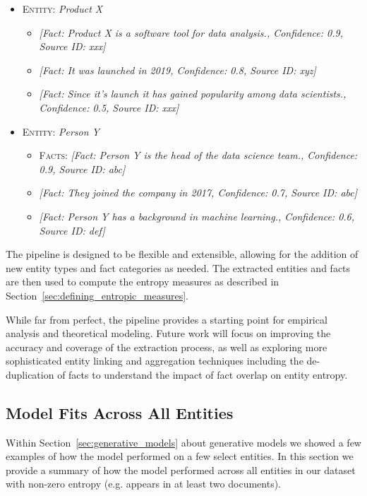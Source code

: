 \documentclass[11pt,a4paper]{article}
\begin{document}
\begin{itemize}
    \item \textsc{Entity:} \textit{Product X}
        \begin{itemize}
        \item \textit{[Fact: Product X is a software tool for data analysis., Confidence: 0.9, Source ID: xxx]}
        \item \textit{[Fact: It was launched in 2019, Confidence: 0.8, Source ID: xyz]}
        \item \textit{[Fact: Since it's launch it has gained popularity among data scientists., Confidence: 0.5, Source ID: xxx]}
        \end{itemize}
    \item \textsc{Entity:} \textit{Person Y}
        \begin{itemize}
        \item \textsc{Facts:} \textit{[Fact: Person Y is the head of the data science team., Confidence: 0.9, Source ID: abc]}
        \item \textit{[Fact: They joined the company in 2017, Confidence: 0.7, Source ID: abc]}
        \item \textit{[Fact: Person Y has a background in machine learning., Confidence: 0.6, Source ID: def]}
        \end{itemize}
    \end{itemize}

The pipeline is designed to be flexible and extensible, allowing for the addition of new entity types and fact categories as needed. The extracted entities and facts are then used to compute the entropy measures as described in Section~\ref{sec:defining_entropic_measures}.

While far from perfect, the pipeline provides a starting point for empirical analysis and theoretical modeling. Future work will focus on improving the accuracy and coverage of the extraction process, as well as exploring more sophisticated entity linking and aggregation techniques including the de-duplication of facts to understand the impact of fact overlap on entity entropy.

\subsection{Model Fits Across All Entities}
\label{appendix:model_fits}

Within Section~\ref{sec:generative_models} about generative models we showed a few examples of how the model performed on a few select entities. In this section we provide a summary of how the model performed across all entities in our dataset with non-zero entropy (e.g. appears in at least two documents).
\end{document}
